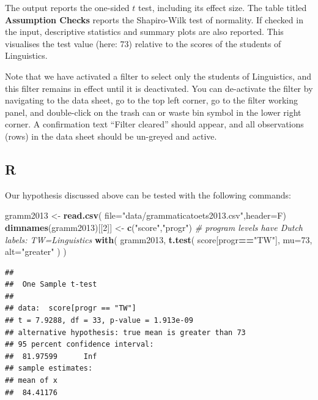 \documentclass[
]{book}
\newenvironment{Shaded}{\begin{snugshade}}{\end{snugshade}}
\newcommand{\CommentTok}[1]{\textcolor[rgb]{0.56,0.35,0.01}{\textit{#1}}}
\newcommand{\DataTypeTok}[1]{\textcolor[rgb]{0.13,0.29,0.53}{#1}}
\newcommand{\DecValTok}[1]{\textcolor[rgb]{0.00,0.00,0.81}{#1}}
\newcommand{\KeywordTok}[1]{\textcolor[rgb]{0.13,0.29,0.53}{\textbf{#1}}}
\newcommand{\NormalTok}[1]{#1}
\newcommand{\OperatorTok}[1]{\textcolor[rgb]{0.81,0.36,0.00}{\textbf{#1}}}
\newcommand{\StringTok}[1]{\textcolor[rgb]{0.31,0.60,0.02}{#1}}
\begin{document}
The output reports the one-sided \(t\) test, including its effect size.
The table titled \textbf{Assumption Checks} reports the Shapiro-Wilk test of normality. If checked in the input, descriptive statistics and summary plots are also reported. This visualises the test value (here: 73) relative to the scores of the students of Linguistics.

Note that we have activated a filter to select only the students of Linguistics, and this filter remains in effect until it is deactivated. You can de-activate the filter by navigating to the data sheet, go to the top left corner, go to the filter working panel, and double-click on the trash can or waste bin symbol in the lower right corner. A confirmation text ``Filter cleared'' should appear, and all observations (rows) in the data sheet should be un-greyed and active.

\hypertarget{r-11}{%
\subsection{R}\label{r-11}}

Our hypothesis discussed above can be tested with the following commands:

\begin{Shaded}
\begin{Highlighting}[]
\NormalTok{gramm2013 \textless{}{-}}\StringTok{ }\KeywordTok{read.csv}\NormalTok{( }\DataTypeTok{file=}\StringTok{"data/grammaticatoets2013.csv"}\NormalTok{,}\DataTypeTok{header=}\NormalTok{F)}
\KeywordTok{dimnames}\NormalTok{(gramm2013)[[}\DecValTok{2}\NormalTok{]] \textless{}{-}}\StringTok{ }\KeywordTok{c}\NormalTok{(}\StringTok{"score"}\NormalTok{,}\StringTok{"progr"}\NormalTok{)}
\CommentTok{\# program levels have Dutch labels: TW=Linguistics}
\KeywordTok{with}\NormalTok{( gramm2013,}
      \KeywordTok{t.test}\NormalTok{( score[progr}\OperatorTok{==}\StringTok{"TW"}\NormalTok{], }\DataTypeTok{mu=}\DecValTok{73}\NormalTok{, }\DataTypeTok{alt=}\StringTok{"greater"}\NormalTok{ ) )}
\end{Highlighting}
\end{Shaded}

\begin{verbatim}
## 
##  One Sample t-test
## 
## data:  score[progr == "TW"]
## t = 7.9288, df = 33, p-value = 1.913e-09
## alternative hypothesis: true mean is greater than 73
## 95 percent confidence interval:
##  81.97599      Inf
## sample estimates:
## mean of x 
##  84.41176
\end{verbatim}
\end{document}
